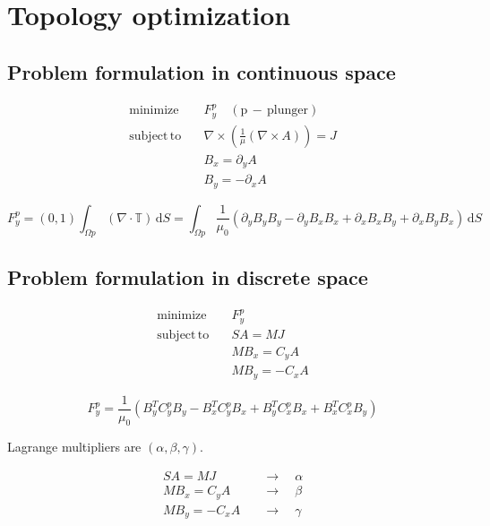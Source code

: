 \newpage
\chapter{Topology optimization}

\section{Problem formulation in continuous space}

\begin{align*} 
\mathrm{minimize}\quad  &  F_y^p \quad \mathrm{(p\,-\,plunger)} \\
\mathrm{subject \, to}\quad  &  \nabla \times \left( \frac{1}{\mu} \left( \nabla \times A \right) \right) = J \\
&  B_x = \partial_y A \\
&  B_y = - \partial_x A
\end{align*}

\begin{equation} \label{eq:43} 
F_y^p = \left(0,1\right) \int_{\Omega p} \left( \nabla \cdot \mathbb{T} \right) \,\mathrm{d}S = \int_{\Omega p} \frac{1}{\mu_0} \left( \partial_y B_y B_y - \partial_y B_x B_x + \partial_x B_x B_y + \partial_x B_y B_x \right) \,\mathrm{d}S
\end{equation}

\section{Problem formulation in discrete space}

\begin{align*} 
\mathrm{minimize}\quad  &  F_y^p \\
\mathrm{subject \, to}\quad  &  S A = M J \\
&  M B_x = C_y A \\
&  M B_y = -C_x A 
\end{align*}


\begin{equation} \label{eq:44} 
F_y^p = \frac{1}{\mu_0} \left(B_y^T C_y^p B_y - B_x^T C_y^p B_x + B_y^T C_x^p B_x + B_x^T C_x^p B_y \right)
\end{equation}

\noindent Lagrange multipliers are $\left(\alpha, \beta, \gamma \right)$.

\begin{align*} 
S A = M J \quad &\rightarrow \quad \alpha \\
M B_x = C_y A \quad &\rightarrow \quad \beta \\
M B_y = -C_x A \quad &\rightarrow \quad \gamma \\
\end{align*}

